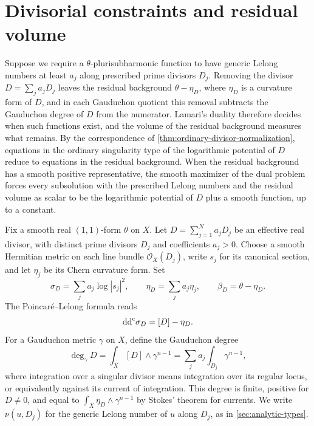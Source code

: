 \section{Divisorial constraints and residual volume}
\label{sec:divisorial-gaud-volume}

Suppose we require a $\theta$-plurisubharmonic function to have generic Lelong numbers at least $a_j$ along prescribed prime divisors $D_j$. Removing the divisor $D=\sum_ja_jD_j$ leaves the residual background $\theta-\eta_D$, where $\eta_D$ is a curvature form of $D$, and in each Gauduchon quotient this removal subtracts the Gauduchon degree of $D$ from the numerator. Lamari's duality therefore decides when such functions exist, and the volume of the residual background measures what remains. By the correspondence of \cref{thm:ordinary-divisor-normalization}, equations in the ordinary singularity type of the logarithmic potential of $D$ reduce to equations in the residual background. When the residual background has a smooth positive representative, the smooth maximizer of the dual problem forces every subsolution with the prescribed Lelong numbers and the residual volume as scalar to be the logarithmic potential of $D$ plus a smooth function, up to a constant.

Fix a smooth real $(1,1)$-form $\theta$ on $X$. Let $D=\sum_{j=1}^N a_jD_j$ be an effective real divisor, with distinct prime divisors $D_j$ and coefficients $a_j>0$. Choose a smooth Hermitian metric on each line bundle $\mathcal O_X(D_j)$, write $s_j$ for its canonical section, and let $\eta_j$ be its Chern curvature form. Set
\[
 \sigma_D=\sum_j a_j\log|s_j|^2,
 \qquad \eta_D=\sum_j a_j\eta_j,
 \qquad \beta_D=\theta-\eta_D.
\]
The Poincar\'e--Lelong formula reads
\[
 \mathrm{dd}^{\mathrm{c}}\sigma_D=[D]-\eta_D.
\]
For a Gauduchon metric $\gamma$ on $X$, define the Gauduchon degree
\[
 \deg_\gamma D=\int_X[D]\wedge\gamma^{n-1}
              =\sum_j a_j\int_{D_j}\gamma^{n-1},
\]
where integration over a singular divisor means integration over its regular locus, or equivalently against its current of integration. This degree is finite, positive for $D\ne0$, and equal to $\int_X\eta_D\wedge\gamma^{n-1}$ by Stokes' theorem for currents. We write $\nu(u,D_j)$ for the generic Lelong number of $u$ along $D_j$, as in \cref{sec:analytic-types}.

